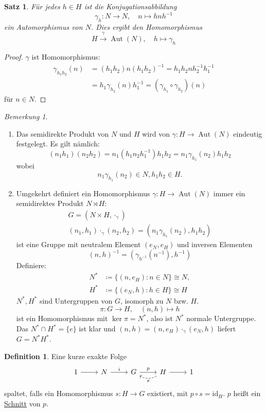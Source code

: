 \documentclass[12pt]{scrartcl} %
\DeclareMathOperator{\Aut}{Aut}
\newcommand{\inv}[1]{\left(#1\right)^{-1}}
\newcommand{\Inv}[1]{#1^{-1}}
\newtheorem{thm}{Satz}
\theoremstyle{definition}
\newtheorem*{defn}{Definition}
\theoremstyle{remark}
\newtheorem*{nb}{Bemerkung}
\newcommand{\defi}{\underline}
\begin{document}
\begin{thm}
	Für jedes $h\in H$ ist die Konjugationsabbildung $$\gamma_h: N\to N, \quad n\mapsto hn\Inv{h}$$ ein Automorphismus von $N$.
	Dies ergibt den Homomorphismus $$H\overset{\gamma}{\longrightarrow} \Aut(N), \quad h\mapsto \gamma_h$$
\end{thm}

\begin{proof}
	$\gamma$ ist Homomorphismus:
	\begin{align*}
		\gamma_{h_1h_2}(n)&=(h_1h_2)n\inv{h_1h_2}=h_1h_2n\Inv{h_2}\Inv{h_1} \\
		&= h_1\gamma_{h_2}(n)\Inv{h_1}=(\gamma_{h_1}\circ\gamma_{h_2})(n)
	\end{align*}
	für $n\in N$.
\end{proof}

\begin{nb}
	\begin{enumerate}[label=(\arabic*)]
	\item Das semidirekte Produkt von $N$ und $H$ wird von $\gamma: H\to \Aut(N)$ eindeutig festgelegt.
		Es gilt nämlich: $$(n_1h_1)(n_2h_2)=n_1(h_1n_2\Inv{h_1})h_1h_2=n_1\gamma_{h_1}(n_2)h_1h_2$$ wobei $$n_1\gamma_{h_1}(n_2)\in N, h_1h_2\in H.$$
	\item Umgekehrt definiert ein Homomorphismus $\gamma: H\to\Aut(N)$ immer ein semidirektes Produkt $N\rtimes H$:
		\begin{gather*}
			G=(N\times H, \cdot_\gamma) \\
			(n_1,h_1)\cdot_\gamma (n_2,h_2)=(n_1\gamma_{h_1}(n_2), h_1h_2)
		\end{gather*}
		ist eine Gruppe mit neutralem Element $(e_N, e_H)$ und inversen Elementen $$\Inv{(n,h)}=(\gamma_{\Inv{h}}(\Inv{n}),\Inv{h})$$
		Definiere:
		\begin{align*}
			N^*&\coloneqq \{(n, e_H): n\in N\} \cong N, \\
			H^*&\coloneqq \{(e_N, h): h\in H\} \cong H
		\end{align*}
		$N^*,H^*$ sind Untergruppen von $G$, isomorph zu $N$ bzw. $H$.
		$$\pi: G\longrightarrow H, \quad (n,h)\mapsto h$$ ist ein Homomorphismus mit $\ker \pi = N^*$, also ist $N^*$ normale Untergruppe.
		Das $N^*\cap H^* = \{e\}$ ist klar und $(n,h)=(n,e_H)\cdot_\gamma (e_N, h)$ liefert $G=N^*H^*$.
	\end{enumerate}
\end{nb}

\begin{defn}
	Eine kurze exakte Folge
	\[ \begin{tikzcd}
		1 \arrow[r] & N \arrow[r, "i"] & G \arrow[r, "p"] & H \arrow[l, bend left, dashed, "s"] \arrow[r] & 1
	\end{tikzcd} \]
	spaltet, falls ein Homomorphismus $s: H\to G$ existiert, mit $p\circ s = \text{id}_H$.
	$p$ heißt ein \defi{Schnitt} von $p$. %
\end{defn}
\end{document}
